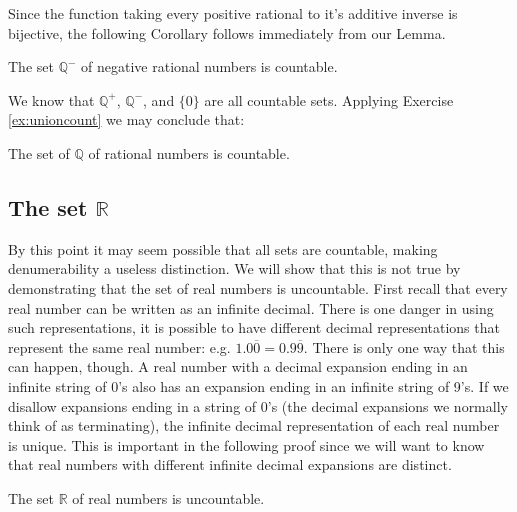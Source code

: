 Since the function taking every positive rational to it's additive inverse is bijective, the following Corollary follows immediately from our Lemma.

\begin{coro}
The set $\mathbb Q^-$ of negative rational numbers is countable.
\end{coro}

We know that $\mathbb Q^+$, $\mathbb Q^-$, and $\{0\}$ are all countable sets.  Applying Exercise \ref{ex:unioncount} we may conclude that:

\begin{thrm}
The set of $\mathbb Q$ of rational numbers is countable.
\end{thrm}

\subsection{The set $\mathbb R$}

By this point it may seem possible that all sets are countable, making denumerability a useless distinction.  We will show that this is not true by demonstrating that the set of real numbers is uncountable. First recall that every real number can be written as an infinite decimal.  There is one danger in using such representations, it is possible to have different decimal representations that represent the same real number: e.g. $1.0\overline 0=0.9\overline 9$.  There is only one way that this can happen, though.  A real number with a decimal expansion ending in an infinite string of 0's also has an expansion ending in an infinite string of 9's.  If we disallow expansions ending in a string of 0's (the decimal expansions we normally think of as terminating), the infinite decimal representation of each real number is unique.  This is important in the following proof since we will want to know that real numbers with different infinite decimal expansions are distinct.

\begin{thrm}\label{thrm:R}
The set $\mathbb R$ of real numbers is uncountable.
\end{thrm}

